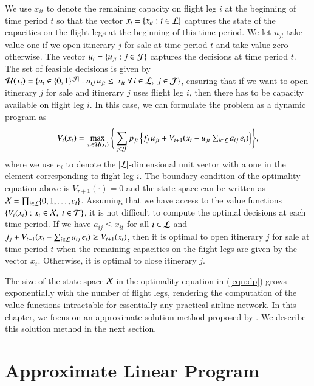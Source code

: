 We use $x_{it}$ to denote the remaining capacity on flight leg $i$ at the beginning of time period $t$ so that the vector $x_t = \{ x_{it} : i \in {\cal L}\}$ captures the state of the capacities on the flight legs at the beginning of this time period. We let $u_{jt}$ take value one if we open itinerary $j$ for sale at  time period $t$ and take value zero otherwise. The vector $u_t = \{ u_{jt} : j \in {\cal J}\}$ captures the decisions at time period $t$. The set of feasible decisions is given by ${\cal U}(x_t) = \{ u_t \in \{0,1\}^{|{\cal J}|} : a_{ij} {\,} u_{jt} \leq {\,} x_{it} ~ \forall {\,}  i \in {\cal L},~j \in {\cal J}\}$, ensuring that if we want to open itinerary $j$ for sale and itinerary $j$ uses flight leg $i$, then there has to be capacity available on flight leg $i$. In this case, we can formulate the problem as a dynamic program as
%
%
\begin{align}
V_t(x_t)
=
\max_{u_t \in {\cal U}(x_t)} \Bigg\{  \sum_{j \in {\cal J}} p_{jt} {\,} \Big\{ f_j  {\,} u_{jt} + V_{t+1}(x_t - \textstyle u_{jt} \sum_{i \in {\cal L}} a_{ij} {\,} e_i ) \Big\}  \Bigg\},
\label{eqn:dp}
\end{align}
%
%
where we use $e_i$ to denote the $|{\cal L}|$-dimensional unit vector with a one in the element corresponding to flight leg $i$. The boundary condition of the optimality equation above is $V_{\tau+1} (\cdot) = 0$ and the state space can be written as ${\cal X} = \prod_{i \in {\cal L}} \{0,1,\ldots,c_i\}$. Assuming that we have access to the value functions $\{ V_t(x_t) : x_t \in {\cal X},~ t \in {\cal T}\}$, it is not difficult to compute the optimal decisions at each time period. If we have $a_{ij} \leq x_{it}$ for all $i \in {\cal L}$ and $f_j + V_{t+1}(x_t - \sum_{i \in {\cal L}} a_{ij} {\,} e_i ) \geq V_{t+1}(x_t)$, then it is optimal to open itinerary $j$ for sale at time period $t$ when the remaining capacities on the flight legs are given by the vector $x_t$. Otherwise, it is optimal to close itinerary $j$. 


The size of the state space ${\cal X}$ in the optimality equation in (\ref{eqn:dp}) grows exponentially with the number of flight legs, rendering the computation of the value functions intractable for essentially any practical airline network. In this chapter, we focus on an approximate solution method proposed by . We describe this solution method in the next section.

\section{Approximate Linear Program}
\label{sec:alp}

